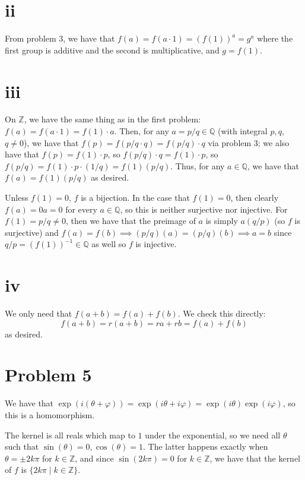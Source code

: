 \documentclass[12pt,letterpaper]{article}
\theoremstyle{definition}
\newcommand{\Z}{\mathbb{Z}}
\newcommand{\Q}{\mathbb{Q}}
\begin{document}
\section*{ii}

From problem 3, we have that $f(a) = f(a \cdot 1) = (f(1))^a = g^a$ where the first group is additive and the second is multiplicative, and $g = f(1)$.

\section*{iii}

On $\Z$, we have the same thing as in the first problem: $f(a) = f(a \cdot 1) = f(1) \cdot a$. Then, for any $a = p/q \in \Q$ (with integral $p,q$, $q \neq 0$), we have that $ f(p) = f(p/q \cdot q) = f(p/q)\cdot q$ via problem 3; we also have that $f(p) = f(1) \cdot p$, so $f(p/q) \cdot q = f(1) \cdot p$, so $f(p/q) = f(1) \cdot p \cdot (1/q) = f(1)(p/q)$. Thus, for any $a \in \Q$, we have that $f(a) = f(1)(p/q)$ as desired.

Unless $f(1) = 0$, $f$ is a bijection. In the case that $f(1) = 0$, then clearly $f(a) = 0a = 0$ for every $a \in \Q$, so this is neither surjective nor injective. For $f(1) = p/q \neq 0$, then we have that the preimage of $a$ is simply $a(q/p)$ (so $f$ is surjective) and $f(a) = f(b) \implies (p/q)(a) = (p/q)(b) \implies a = b$ since $q/p = (f(1))^{-1} \in \Q$ as well so $f$ is injective.

\section*{iv}

We only need that $f(a + b) = f(a) + f(b)$. We check this directly:
\[
  f(a + b) = r(a + b) = ra + rb = f(a) + f(b)
\]
as desired.

\section*{Problem 5}

We have that $\exp(i(\theta + \varphi)) = \exp(i\theta + i\varphi) = \exp(i\theta)\exp(i\varphi)$, so this is a homomorphism.

The kernel is all reals which map to $1$ under the exponential, so we need all $\theta$ such that $\sin(\theta) = 0, \cos(\theta) = 1$. The latter happens exactly when $\theta = \pm 2k\pi$ for $k \in \Z$, and since $\sin(2k\pi) = 0$ for $k \in \Z$, we have that the kernel of $f$ is $\{2k \pi \mid k \in \Z\}$.
\end{document}
